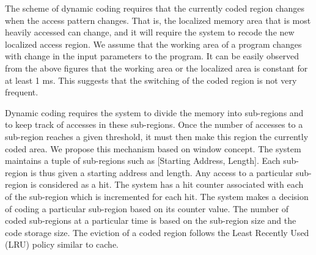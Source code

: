The scheme of dynamic coding requires that the currently coded region changes 
when the access pattern changes. That is, the localized memory area that is most heavily accessed 
can change, and it will require the system to recode the new localized access 
region. We assume that the working area of a program changes with change in the 
input parameters to the program. It can be easily observed from the above 
figures that the working area or the localized area is constant for at least 1 
ms. This suggests that the switching of the coded region is not very frequent. 

Dynamic coding requires the system to divide the memory into sub-regions and to 
keep track of accesses in these sub-regions. Once the number of accesses to a 
sub-region reaches a given threshold, it must then make this region the 
currently coded area. We propose this mechanism based on window concept. The 
system maintains a tuple of sub-regions such as [Starting Address, Length]. Each 
sub-region is thus given a starting address and length. Any access to a 
particular sub-region is considered as a hit. The system has a hit counter 
associated with each of the sub-region which is incremented for each hit. The 
system makes a decision of coding a particular sub-region based on its counter 
value. The number of coded sub-regions at a particular time is based on the 
sub-region size and the code storage size. The eviction of a coded region 
follows the Least Recently Used (LRU) policy similar to cache. 

